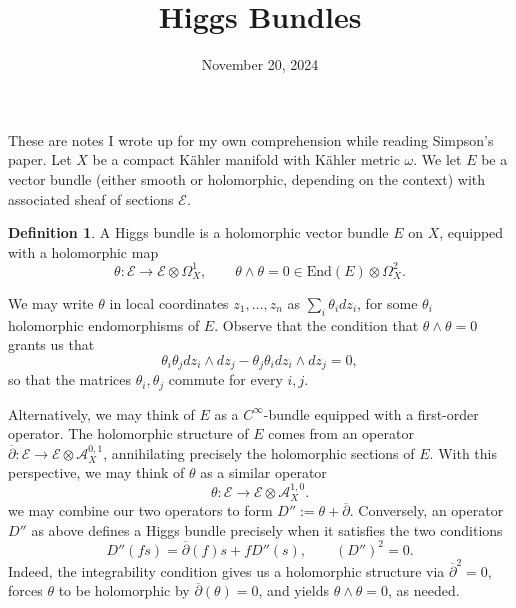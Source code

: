 \documentclass[letterpaper, 12pt]{article}
\title{Higgs Bundles}
\date{November 20, 2024}
\newcommand{\End}{\text{End}}
\theoremstyle{definition}
\newtheorem{definition}[theorem]{Definition}
\newcommand{\E}{\mathcal{E}}
\newcommand{\smooth}{C^\infty}
\newcommand{\del}{\partial}
\newcommand{\delbar}{\overline{\del}}
\begin{document}
\maketitle

These are notes I wrote up for my own comprehension while reading Simpson's paper.
Let $X$ be a compact K\"ahler manifold with K\"ahler metric \(\omega\). We let $E$ be a vector bundle (either smooth or holomorphic, depending on the context) with associated sheaf of sections $\E$.

\begin{definition}
    A Higgs bundle is a holomorphic vector bundle $E$ on $X$, equipped with a holomorphic map
    \begin{equation}
        \theta: \E \to \E \otimes \Omega_X^1, \qquad \theta \wedge \theta = 0 \in \End(E) \otimes \Omega_X^2.
    \end{equation}
\end{definition}

We may write \(\theta\) in local coordinates \(z_1,\dots, z_n\) as \(\sum_i \theta_i dz_i\), for some \(\theta_i\) holomorphic endomorphisms of $E$. Observe that the condition that \(\theta \wedge \theta = 0\) grants us that
\begin{equation}
    \theta_i \theta_j dz_i \wedge dz_j - \theta_j \theta_i dz_i \wedge dz_j = 0,
\end{equation}
so that the matrices \(\theta_i, \theta_j\) commute for every $i, j$.

Alternatively, we may think of $E$ as a $\smooth$-bundle equipped with a first-order operator. The holomorphic structure of $E$ comes from an operator
\( \delbar: \E \to \E \otimes \mathcal{A}^{0,1}_X \), annihilating precisely the holomorphic sections of $E$. With this perspective, we may think of $\theta$ as a similar operator
\begin{equation}
    \theta: \E \to \E \otimes \mathcal{A}^{1,0}_X.
\end{equation}
we may combine our two operators to form $D'' := \theta + \delbar$. Conversely, an operator $D''$ as above defines a Higgs bundle precisely when it satisfies the two conditions
\begin{equation}
    D''(fs) = \delbar(f)s + fD''(s),\qquad (D'')^2 = 0.
\end{equation}
Indeed, the integrability condition gives us a holomorphic structure via $\delbar^2 = 0$, forces $\theta$ to be holomorphic by $\delbar(\theta) = 0$, and yields $\theta \wedge \theta = 0$, as needed.
\end{document}
